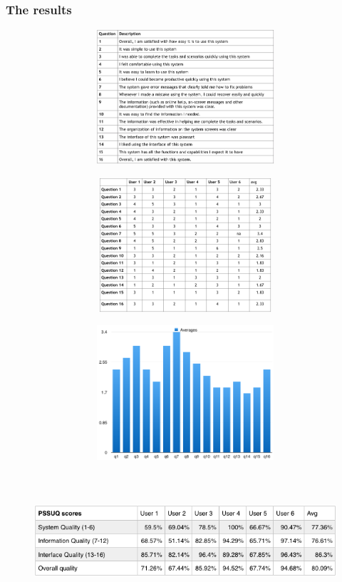 \documentclass[12pt]{article}
\begin{document}
{\subsubsection{The results}
\begin{center}
	\begin{figure}[h]
		\includegraphics[width=15cm, height=5cm]{tests/usab/questions.png}
	\end{figure}
	\begin{figure}[h]
		\includegraphics[width=15cm, height=5cm]{tests/usab/results.png}
	\end{figure}
	\begin{figure}[h]
		\includegraphics[width=15cm, height=5cm]{tests/usab/avgs.png}
	\end{figure}
	\begin{figure}[h]
		\includegraphics[width=15cm, height=5cm]{tests/usab/pssuq.png}
	\end{figure}
\end{center}

}
\end{document}
